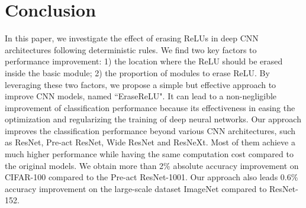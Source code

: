 \documentclass[10pt,twocolumn,letterpaper]{article}
\begin{document}
\section{Conclusion}

In this paper, we investigate the effect of erasing ReLUs in deep CNN architectures following deterministic rules.
We find two key factors to performance improvement:
1) the location where the ReLU should be erased inside the basic module;
2) the proportion of modules to erase ReLU.
By leveraging these two factors, we propose a simple but effective approach to improve CNN models, named ``EraseReLU".
It can lead to a non-negligible improvement of classification performance because its effectiveness in easing the optimization and regularizing the training of deep neural networks.
Our approach improves the classification performance beyond various CNN architectures, such as ResNet, Pre-act ResNet, Wide ResNet and ResNeXt.
Most of them achieve a much higher performance while having the same computation cost compared to the original models.
We obtain more than 2\% absolute accuracy improvement on CIFAR-100 compared to the Pre-act ResNet-1001.
Our approach also leads 0.6\% accuracy improvement on the large-scale dataset ImageNet compared to ResNet-152.


{\small


}
\end{document}
